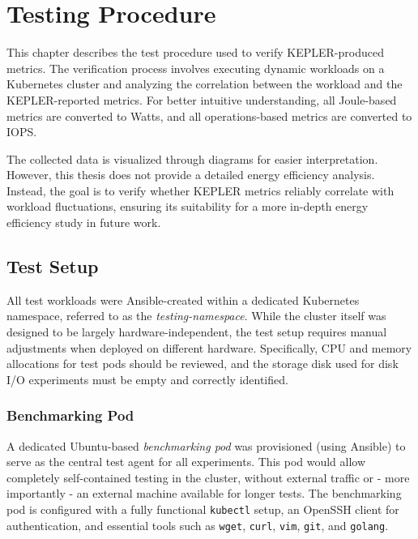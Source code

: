 
\chapter{Testing Procedure} %
\label{Chapter4}

This chapter describes the test procedure used to verify KEPLER-produced metrics. The verification process involves executing dynamic workloads on a Kubernetes cluster and analyzing the correlation between the workload and the KEPLER-reported metrics. For better intuitive understanding, all Joule-based metrics are converted to Watts, and all operations-based metrics are converted to IOPS.

The collected data is visualized through diagrams for easier interpretation. However, this thesis does not provide a detailed energy efficiency analysis. Instead, the goal is to verify whether KEPLER metrics reliably correlate with workload fluctuations, ensuring its suitability for a more in-depth energy efficiency study in future work.

\section{Test Setup}
All test workloads were Ansible-created within a dedicated Kubernetes namespace, referred to as the \textit{testing-namespace}. While the cluster itself was designed to be largely hardware-independent, the test setup requires manual adjustments when deployed on different hardware. Specifically, CPU and memory allocations for test pods should be reviewed, and the storage disk used for disk I/O experiments must be empty and correctly identified.

\subsection{Benchmarking Pod}
A dedicated Ubuntu-based \textit{benchmarking pod} was provisioned (using Ansible) to serve as the central test agent for all experiments. This pod would allow completely self-contained testing in the cluster, without external traffic or - more importantly - an external machine available for longer tests. The benchmarking pod is configured with a fully functional \texttt{kubectl} setup, an OpenSSH client for authentication, and essential tools such as \texttt{wget}, \texttt{curl}, \texttt{vim}, \texttt{git}, and \texttt{golang}.

